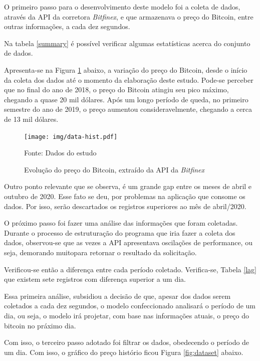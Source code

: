 \documentclass[12pt]{article}
\begin{document}
O primeiro passo para o desenvolvimento deste modelo foi a coleta de dados, 
através da API da corretora \textit{Bitfinex}, e que armazenava o preço do 
Bitcoin, entre outras informações, a cada dez segundos.

Na tabela \ref{summary} é possível verificar algumas estatísticas acerca do 
conjunto de dados.



Apresenta-se na Figura \ref{fig:data-hist} abaixo, a variação do preço do 
Bitcoin, desde o início da coleta dos dados até o momento da elaboração deste 
estudo. Pode-se perceber que no final do ano de 2018, o preço do Bitcoin atingiu 
seu pico máximo, chegando a quase 20 mil dólares. Após um longo período de 
queda, no primeiro semestre do ano de 2019, o preço aumentou consideravelmente, 
chegando a cerca de 13 mil dólares.


\begin{figure}[ht]
  \centering
  \texttt{[image: img/data-hist.pdf]}
  \caption{Evolução do preço do Bitcoin, extraído da API da \textit{Bitfinex}}
  Fonte: Dados do estudo
  \label{fig:data-hist}
\end{figure}


Outro ponto relevante que se observa, é um grande gap entre os meses de 
abril e outubro de 2020. Esse fato se deu, por problemas na aplicação que 
consome os dados. Por isso, serão descartados os registros superiores ao mês 
de abril/2020.

O próximo passo foi fazer uma análise das informações que foram coletadas. 
Durante o processo de estruturação do programa que iria fazer a coleta dos 
dados, observou-se que as vezes a API apresentava oscilações de performance, 
ou seja, demorando muitopara retornar o resultado da solicitação.

Verificou-se então a diferença entre cada período coletado. Verifica-se,
Tabela \ref{lag} que existem sete registros com diferença superior a um dia. 



Essa primeira análise, subsidiou a decisão de que, apesar dos dados serem 
coletados a cada dez segundos, o modelo confeccionado analisará o período de 
um dia, ou seja, o modelo irá projetar, com base nas informações atuais, 
o preço do bitcoin no práximo dia.

Com isso, o terceiro passo adotado foi filtrar os dados, obedecendo o período 
de um dia. Com isso, o gráfico do preço histório ficou Figura \ref{fig:dataset}
abaixo.
\end{document}
